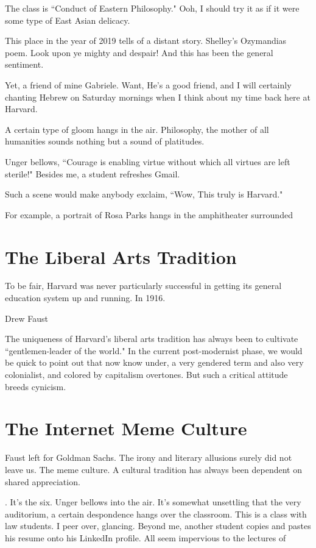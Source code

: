 \documentclass[12pt,letterpaper]{article}
\begin{document}
The class is ``Conduct of Eastern Philosophy."  Ooh, I should try it as if it were some type of East Asian delicacy.

This place in the year of 2019 tells of a distant story.  Shelley's Ozymandias poem.  Look upon ye mighty and despair!  And this has been the general sentiment.

Yet, a friend of mine Gabriele.  Want, He's a good friend, and I will certainly chanting Hebrew on Saturday mornings when I think about my time back here at Harvard.

A certain type of gloom hangs in the air.  Philosophy, the mother of all humanities sounds nothing but a sound of platitudes.  

Unger bellows, ``Courage is enabling virtue without which all virtues are left sterile!"  Besides me, a student refreshes Gmail.


 Such a scene would make anybody exclaim, ``Wow,  This truly is Harvard."

For example, a portrait of Rosa Parks hangs in the amphitheater surrounded 

\section{The Liberal Arts Tradition}
To be fair, Harvard was never particularly successful in getting its general education system up and running.  In 1916.

Drew Faust

The uniqueness of Harvard's liberal arts tradition has always been to cultivate ``gentlemen-leader of the world."  In the current post-modernist phase, we would be quick to point out that now know under, a very gendered term and also very colonialist, and colored by capitalism overtones.  But such a critical attitude breeds cynicism.

\section{The Internet Meme Culture}

Faust left for Goldman Sachs.  The irony and literary allusions surely did not leave us.  The meme culture.  A cultural tradition has always been dependent on shared appreciation.

.   It's the six.  Unger bellows into the air.  It's somewhat unsettling that the very auditorium, a certain despondence hangs over the classroom.  This is a class with law students.  I peer over, glancing.  Beyond me, another student copies and pastes his resume onto his LinkedIn profile.  All seem impervious to the lectures of 
\end{document}
